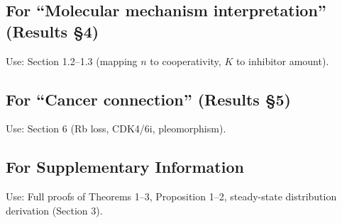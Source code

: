 \documentclass[11pt]{article}
\begin{document}
\subsection*{For ``Molecular mechanism interpretation'' (Results \S4)}
Use: Section 1.2--1.3 (mapping $n$ to cooperativity, $K$ to inhibitor amount).

\subsection*{For ``Cancer connection'' (Results \S5)}
Use: Section 6 (Rb loss, CDK4/6i, pleomorphism).

\subsection*{For Supplementary Information}
Use: Full proofs of Theorems 1--3, Proposition 1--2, steady-state distribution derivation (Section 3).
\end{document}
